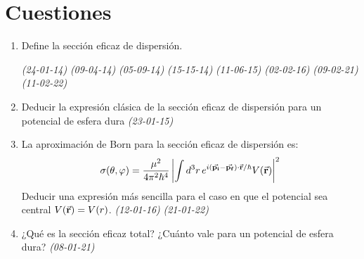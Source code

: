 \section{Cuestiones}

\begin{enumerate}
    \item Define la sección eficaz de dispersión. 
    
    \textit{(24-01-14)} \textit{(09-04-14)} \textit{(05-09-14)} \textit{(15-15-14)}  \textit{(11-06-15)} \textit{(02-02-16)}  \textit{(09-02-21)}  \textit{(11-02-22)} 
    \item Deducir la expresión clásica de la sección eficaz de dispersión para un potencial de esfera dura \textit{(23-01-15)}
    
    \item La aproximación de Born para la sección eficaz de dispersión es:
    \[
    \sigma(\theta, \varphi) = \frac{\mu^2}{4 \pi^2 \hbar^4} \left| \int d^3 r \, e^{i (\va{p_i} - \va{p_f}) \cdot \va{r} / \hbar} V(\va{r}) \right|^2
    \]
    Deducir una expresión más sencilla para el caso en que el potencial sea central $V(\va{r}) = V(r)$. \textit{(12-01-16)} \textit{(21-01-22)}

    \item ¿Qué es la sección eficaz total? ¿Cuánto vale para un potencial de esfera dura? \textit{(08-01-21)}

\end{enumerate}